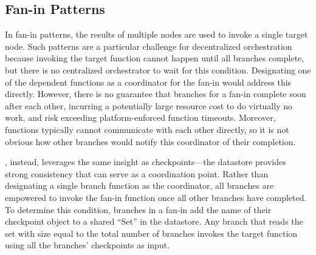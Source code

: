 
\subsection{Fan-in Patterns}\label{sec:design:fanin}

In fan-in patterns, the results of multiple nodes are used to invoke a single
target node. Such patterns are a particular challenge for decentralized
orchestration because invoking the target function cannot happen until all
branches complete, but there is no centralized orchestrator to wait for this
condition. Designating one of the dependent functions as a coordinator for the
fan-in would address this directly. However, there is no guarantee that
branches for a fan-in complete soon after each other, incurring a potentially
large resource cost to do virtually no work, and risk exceeding
platform-enforced function timeouts. Moreover, functions typically cannot
communicate with each other directly, so it is not obvious how other branches
would notify this coordinator of their completion.

\name{}, instead, leverages the same insight as checkpoints---the datastore
provides strong consistency that can serve as a coordination point. Rather
than designating a single branch function as the coordinator, all branches are
empowered to invoke the fan-in function once all other branches have
completed. To determine this condition, branches in a fan-in add the name of
their checkpoint object to a shared ``Set'' in the datastore. Any branch that
reads the set with size equal to the total number of branches invokes the
target function using all the branches' checkpoints as input.

